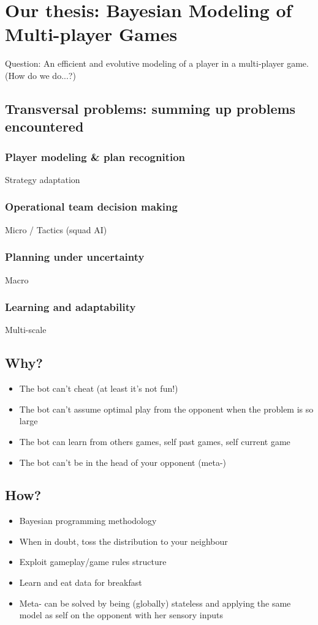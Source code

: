 \chapter{Our thesis: Bayesian Modeling of Multi-player Games}

Question:
An efficient and evolutive modeling of a player in a multi-player game.
(How do we do...?)

\section{Transversal problems: summing up problems encountered}
\subsection{Player modeling \& plan recognition}
Strategy adaptation
\subsection{Operational team decision making}
Micro / Tactics (squad AI)
\subsection{Planning under uncertainty}
Macro
\subsection{Learning and adaptability}
Multi-scale

\section{Why?}
\begin{itemize}
\item The bot can't cheat (at least it's not fun!)
\item The bot can't assume optimal play from the opponent when the problem is so large
\item The bot can learn from others games, self past games, self current game
\item The bot can't be in the head of your opponent (meta-)
\end{itemize}

\section{How?}
\begin{itemize}
\item Bayesian programming methodology
\item When in doubt, toss the distribution to your neighbour
\item Exploit gameplay/game rules structure
\item Learn and eat data for breakfast
\item Meta- can be solved by being (globally) stateless and applying the same model as self on the opponent with her sensory inputs
\end{itemize}
